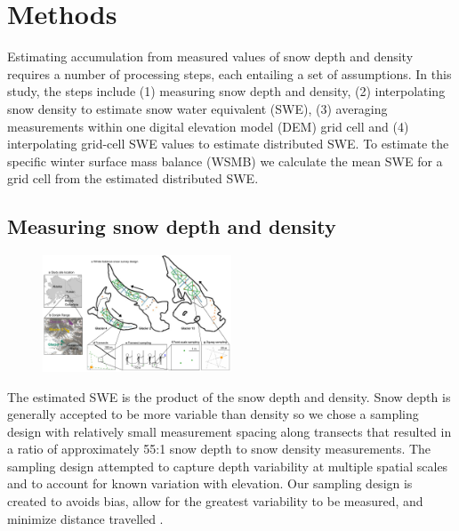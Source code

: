 \documentclass[twocolumn,letterpaper]{igs}
\begin{document}


\section{Methods}

Estimating accumulation from measured values of snow depth and density requires a number of processing steps, each entailing a set of assumptions.  In this study, the steps include (1) measuring snow depth and density, (2) interpolating snow density to estimate snow water equivalent (SWE), (3) averaging measurements within one digital elevation model (DEM) grid cell and (4) interpolating grid-cell SWE values to estimate distributed SWE. To estimate the specific winter surface mass balance (WSMB) we calculate the mean SWE for a grid cell from the estimated distributed SWE. 

\subsection{Measuring snow depth and density}

\begin{figure}
	\centering
	\includegraphics[width =0.5\textwidth]{Sampling.pdf}\\
	\caption{}
	\label{fig:Sampling}
\end{figure}

The estimated SWE is the product of the snow depth and density. Snow depth is generally accepted to be more variable than density \citep{Elder1991, Clark2011, Lopez2013} so we chose a sampling design with relatively small measurement spacing along transects that resulted in a ratio of approximately 55:1 snow depth to snow density measurements. The sampling design attempted to capture depth variability at multiple spatial scales and to account for known variation with elevation. Our sampling design is created to avoids bias, allow for the greatest variability to be measured, and minimize distance travelled \citep{Shea2010}.
\end{document}
